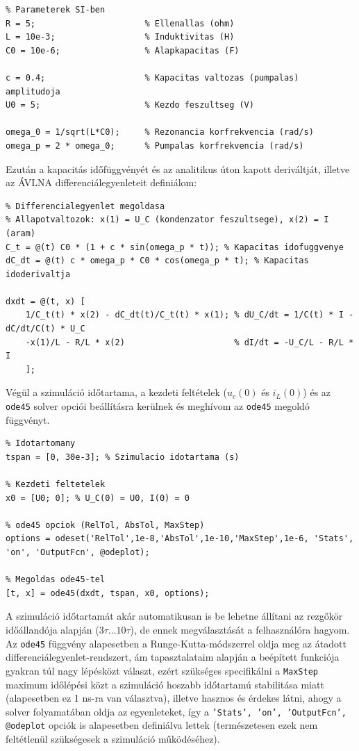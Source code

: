 \documentclass[12pt,a4paper]{article}
\begin{document}
\begin{lstlisting}
% Parameterek SI-ben
R = 5;                      % Ellenallas (ohm)
L = 10e-3;                  % Induktivitas (H)
C0 = 10e-6;                 % Alapkapacitas (F)

c = 0.4;                    % Kapacitas valtozas (pumpalas) amplitudoja
U0 = 5;                     % Kezdo feszultseg (V)

omega_0 = 1/sqrt(L*C0);     % Rezonancia korfrekvencia (rad/s)
omega_p = 2 * omega_0;      % Pumpalas korfrekvencia (rad/s)
\end{lstlisting}

Ezután a kapacitás időfüggvényét és az analitikus úton kapott deriváltját, illetve az ÁVLNA differenciálegyenleteit definiálom:

\begin{lstlisting}
% Differencialegyenlet megoldasa
% Allapotvaltozok: x(1) = U_C (kondenzator feszultsege), x(2) = I (aram)
C_t = @(t) C0 * (1 + c * sin(omega_p * t)); % Kapacitas idofuggvenye
dC_dt = @(t) c * omega_p * C0 * cos(omega_p * t); % Kapacitas idoderivaltja

dxdt = @(t, x) [
    1/C_t(t) * x(2) - dC_dt(t)/C_t(t) * x(1); % dU_C/dt = 1/C(t) * I - dC/dt/C(t) * U_C
    -x(1)/L - R/L * x(2)                      % dI/dt = -U_C/L - R/L * I
    ];
\end{lstlisting}

Végül a szimuláció időtartama, a kezdeti feltételek ($u_c(0)$ és $i_L(0)$) és az \texttt{ode45} solver opciói beállításra kerülnek és meghívom az \texttt{ode45} megoldó függvényt.

\begin{lstlisting}
% Idotartomany
tspan = [0, 30e-3]; % Szimulacio idotartama (s)

% Kezdeti feltetelek
x0 = [U0; 0]; % U_C(0) = U0, I(0) = 0

% ode45 opciok (RelTol, AbsTol, MaxStep)
options = odeset('RelTol',1e-8,'AbsTol',1e-10,'MaxStep',1e-6, 'Stats', 'on', 'OutputFcn', @odeplot);

% Megoldas ode45-tel
[t, x] = ode45(dxdt, tspan, x0, options);
\end{lstlisting}

A szimuláció időtartamát akár automatikusan is be lehetne állítani az rezgőkör időállandója alapján ($3\tau \dots 10 \tau$), de ennek megválasztását
a felhasználóra hagyom. Az \texttt{ode45} függvény alapesetben a Runge-Kutta-módszerrel oldja meg az átadott differenciálegyenlet-rendszert, ám tapasztalataim
alapján a beépített funkciója gyakran túl nagy lépésközt választ, ezért szükséges specifikálni a \texttt{MaxStep} maximum időlépési közt a szimuláció
hoszabb időtartamú stabilitása miatt (alapesetben ez 1 ns-ra van választva), illetve hasznos és érdekes látni, ahogy a solver folyamatában oldja az egyenleteket,
így a \texttt{'Stats', 'on', 'OutputFcn', @odeplot} opciók is alapesetben definiálva lettek (természetesen ezek nem feltétlenül szükségesek a szimuláció működéséhez).
\end{document}
